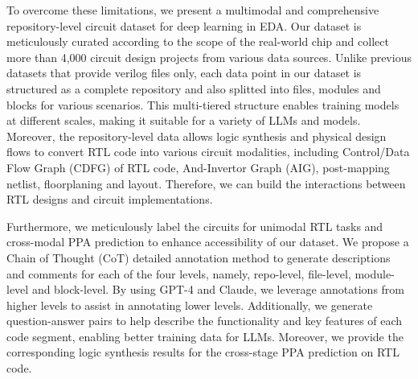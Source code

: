 To overcome these limitations, we present a multimodal and comprehensive
repository-level circuit dataset for deep learning in EDA. Our dataset is meticulously curated according to the scope of the real-world chip and collect more than 4,000 circuit design projects from various data sources. Unlike previous datasets that provide verilog files only\cite{chang2024dataisall,thakur2023benchmarking}, each data point in our dataset is structured as a complete repository and also splitted into files, modules and blocks for various scenarios. This multi-tiered structure enables training models at different scales, making it suitable for a variety of LLMs and models. Moreover, the repository-level data allows logic synthesis and physical design flows to convert RTL code into various circuit modalities, including Control/Data Flow Graph (CDFG) of RTL code, And-Invertor Graph (AIG), post-mapping netlist, floorplaning and layout. Therefore, we can build the interactions between RTL designs and circuit implementations. 

Furthermore, we meticulously label the circuits for unimodal RTL tasks and cross-modal PPA prediction to enhance accessibility of our dataset. We propose a Chain of Thought (CoT)\cite{wei2022chainofthought} detailed annotation method to generate descriptions and comments for each of the four levels, namely, repo-level, file-level, module-level and block-level.  By using GPT-4\cite{achiam2023gpt} and Claude\cite{claude}, we leverage annotations from higher levels to assist in annotating lower levels. Additionally, we generate question-answer pairs to help describe the functionality and key features of each code segment, enabling better training data for LLMs. Moreover, we provide the corresponding logic synthesis results for the cross-stage PPA prediction on RTL code. 

